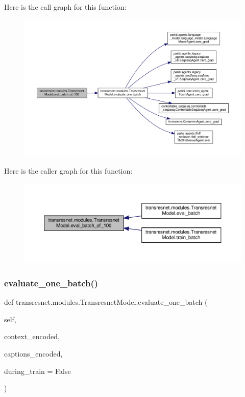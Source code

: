 Here is the call graph for this function\+:
\nopagebreak
\begin{figure}[H]
\begin{center}
\leavevmode
\includegraphics[width=350pt]{classtransresnet_1_1modules_1_1TransresnetModel_a1cd91f1cd051b1545683b465f7a74e12_cgraph}
\end{center}
\end{figure}
Here is the caller graph for this function\+:
\nopagebreak
\begin{figure}[H]
\begin{center}
\leavevmode
\includegraphics[width=350pt]{classtransresnet_1_1modules_1_1TransresnetModel_a1cd91f1cd051b1545683b465f7a74e12_icgraph}
\end{center}
\end{figure}
\mbox{\label{classtransresnet_1_1modules_1_1TransresnetModel_a2cce905d8e06109ae23cf4910386526d}} 
\subsubsection{\texorpdfstring{evaluate\+\_\+one\+\_\+batch()}{evaluate\_one\_batch()}}
{\footnotesize\ttfamily def transresnet.\+modules.\+Transresnet\+Model.\+evaluate\+\_\+one\+\_\+batch (\begin{DoxyParamCaption}\item[{}]{self,  }\item[{}]{context\+\_\+encoded,  }\item[{}]{captions\+\_\+encoded,  }\item[{}]{during\+\_\+train = {\ttfamily False} }\end{DoxyParamCaption})}


